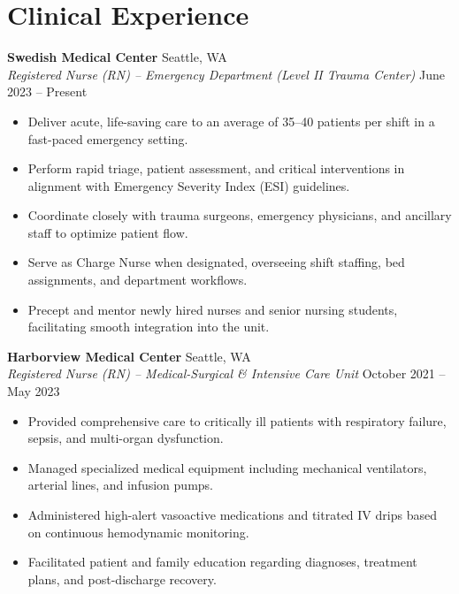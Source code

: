 \documentclass[10pt,letterpaper]{article}
\begin{document}
\vspace{2.5mm}

\section*{Clinical Experience}

\textbf{Swedish Medical Center} \hfill Seattle, WA \\
\textit{Registered Nurse (RN) -- Emergency Department (Level II Trauma Center)} \hfill June 2023 -- Present
\vspace{1mm}
\begin{itemize}[leftmargin=*,noitemsep,topsep=1pt,parsep=0pt,partopsep=0pt]
    \item Deliver acute, life-saving care to an average of 35--40 patients per shift in a fast-paced emergency setting.
    \item Perform rapid triage, patient assessment, and critical interventions in alignment with Emergency Severity Index (ESI) guidelines.
    \item Coordinate closely with trauma surgeons, emergency physicians, and ancillary staff to optimize patient flow.
    \item Serve as Charge Nurse when designated, overseeing shift staffing, bed assignments, and department workflows.
    \item Precept and mentor newly hired nurses and senior nursing students, facilitating smooth integration into the unit.
\end{itemize}

\vspace{2mm}

\textbf{Harborview Medical Center} \hfill Seattle, WA \\
\textit{Registered Nurse (RN) -- Medical-Surgical \& Intensive Care Unit} \hfill October 2021 -- May 2023
\vspace{1mm}
\begin{itemize}[leftmargin=*,noitemsep,topsep=1pt,parsep=0pt,partopsep=0pt]
    \item Provided comprehensive care to critically ill patients with respiratory failure, sepsis, and multi-organ dysfunction.
    \item Managed specialized medical equipment including mechanical ventilators, arterial lines, and infusion pumps.
    \item Administered high-alert vasoactive medications and titrated IV drips based on continuous hemodynamic monitoring.
    \item Facilitated patient and family education regarding diagnoses, treatment plans, and post-discharge recovery.
\end{itemize}
\end{document}
